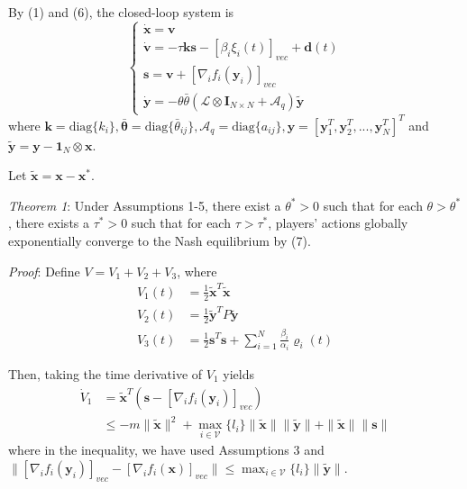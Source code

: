 \documentclass[lettersize,journal]{IEEEtran}
\begin{document}
By (1) and (6), the closed-loop system is
\begin{equation}
    \begin{cases}
        \dot{\mathbf{x}}=\mathbf{v}                                                      \\
        \dot{\mathbf{v}}=-\tau\mathbf{k}\mathbf{s}-[\beta_i\xi_i(t)]_{vec}+\mathbf{d}(t) \\
        \mathbf{s}=\mathbf{v}+[\nabla_if_i(\mathbf{y}_i)]_{vec}                          \\
        \dot{\mathbf{y}}=-\theta\bar{\theta}(\mathcal{L}\otimes\mathbf{I}_{N\times N}+\mathcal{A}_q)\tilde{\mathbf{y}}
    \end{cases}
\end{equation}
where $\mathbf{k} = \text{diag}\{k_i\},
    \bar{\mathbf{\theta}} = \text{diag}\{\bar{\theta}_{ij}\},
    \mathcal{A}_q = \text{diag}\{a_{ij}\}, \mathbf{y} = [\mathbf{y}_1^T,\mathbf{y}_2^T,...,\mathbf{y}_N^T]^T$ and $\tilde{\mathbf{y}} = \mathbf{y} - \mathbf{1}_N \otimes \mathbf{x}$.

Let $\tilde{\mathbf{x}} = \mathbf{x} - \mathbf{x}^*$.

\emph{Theorem 1}: Under Assumptions 1-5, there exist a $\theta^* > 0$ such that for each $\theta > \theta^*$, there exists a $\tau^* > 0$ such that for each $\tau > \tau^*$, players' actions globally exponentially converge to the Nash equilibrium by (7).

\emph{Proof}: Define $V = V_1 + V_2 + V_3$, where
\begin{equation}
    \begin{aligned}
        V_1(t) & = \frac{1}{2}\tilde{\mathbf{x}}^{T}\tilde{\mathbf{x}}                                         \\
        V_2(t) & = \frac{1}{2}\tilde{\mathbf{y}}^{T}P\tilde{\mathbf{y}}                                        \\
        V_3(t) & = \frac{1}{2}\mathbf{s}^{T}\mathbf{s} + \sum_{i = 1}^{N} \frac{\beta_i}{\alpha_i}\varrho_i(t)
    \end{aligned}
\end{equation}

Then, taking the time derivative of $V_1$ yields
\begin{equation}
    \begin{aligned}
        \dot{V}_{1} & =\tilde{\mathbf{x}}^{T}(\mathbf{s}-[\nabla_{i}f_{i}(\mathbf{y}_{i})]_{vec})                                                                   \\
                    & \leq-m\|\tilde{\mathbf{x}}\|^2+\max_{i\in\mathcal{V}}\{l_i\}\|\tilde{\mathbf{x}}\|\|\tilde{\mathbf{y}}\|+\|\tilde{\mathbf{x}}\|\|\mathbf{s}\|
    \end{aligned}
\end{equation}
where in the inequality, we have used Assumptions 3 and $\|[\nabla_{i}f_{i}(\mathbf{y}_{i})]_{vec}-[\nabla_{i}f_{i}(\mathbf{x})]_{vec}\|\leq\max_{i\in\mathcal{V}}\{l_{i}\}\|\tilde{\mathbf{y}}\|$.
\end{document}
